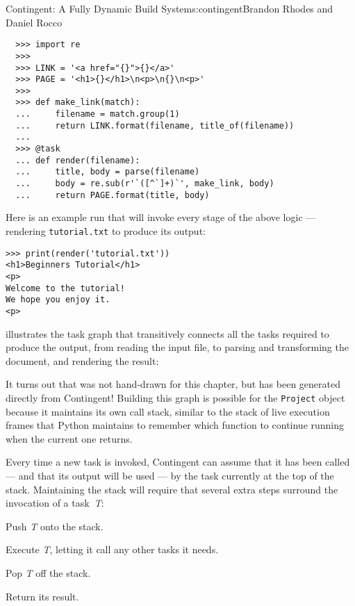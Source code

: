 \begin{aosachapter}{Contingent: A Fully Dynamic Build System}{s:contingent}{Brandon Rhodes and Daniel Rocco}
\begin{verbatim}
  >>> import re
  >>>
  >>> LINK = '<a href="{}">{}</a>'
  >>> PAGE = '<h1>{}</h1>\n<p>\n{}\n<p>'
  >>>
  >>> def make_link(match):
  ...     filename = match.group(1)
  ...     return LINK.format(filename, title_of(filename))
  ...
  >>> @task
  ... def render(filename):
  ...     title, body = parse(filename)
  ...     body = re.sub(r'`([^`]+)`', make_link, body)
  ...     return PAGE.format(title, body)
\end{verbatim}

Here is an example run that will invoke every stage of the above logic
--- rendering \texttt{tutorial.txt} to produce its output:

\begin{verbatim}
>>> print(render('tutorial.txt'))
<h1>Beginners Tutorial</h1>
<p>
Welcome to the tutorial!
We hope you enjoy it.
<p>
\end{verbatim}

 illustrates the task graph that
transitively connects all the tasks required to produce the output, from
reading the input file, to parsing and transforming the document, and
rendering the result:


It turns out that  was not hand-drawn
for this chapter, but has been generated directly from Contingent!
Building this graph is possible for the \texttt{Project} object because
it maintains its own call stack, similar to the stack of live execution
frames that Python maintains to remember which function to continue
running when the current one returns.

Every time a new task is invoked, Contingent can assume that it has been
called --- and that its output will be used --- by the task currently at
the top of the stack. Maintaining the stack will require that several
extra steps surround the invocation of a task~\emph{T}:

\begin{aosaenumerate}
\def\labelenumi{\arabic{enumi}.}

\item
  Push \emph{T} onto the stack.
\item
  Execute \emph{T}, letting it call any other tasks it needs.
\item
  Pop \emph{T} off the stack.
\item
  Return its result.
\end{aosaenumerate}


\end{aosachapter}
